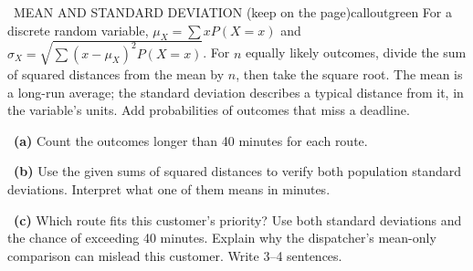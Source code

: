 \documentclass[11pt]{article}
\begin{document}
\begin{callout}{\IconBook\ MEAN AND STANDARD DEVIATION (keep on the page)}{calloutgreen}
For a discrete random variable, $\mu_X=\sum xP(X=x)$ and $\sigma_X=\sqrt{\sum(x-\mu_X)^2P(X=x)}$. For $n$ equally likely outcomes, divide the sum of squared distances from the mean by $n$, then take the square root. The mean is a long-run average; the standard deviation describes a typical distance from it, in the variable's units. Add probabilities of outcomes that miss a deadline.
\end{callout}

~\textbf{(a)} Count the outcomes longer than 40 minutes for each route.\par
{}

~\textbf{(b)} Use the given sums of squared distances to verify both population standard deviations. Interpret what one of them means in minutes.\par
{}

~\textbf{(c)} Which route fits this customer's priority? Use both standard deviations and the chance of exceeding 40 minutes. Explain why the dispatcher's mean-only comparison can mislead this customer. Write 3--4 sentences.\par
{}
\end{document}
